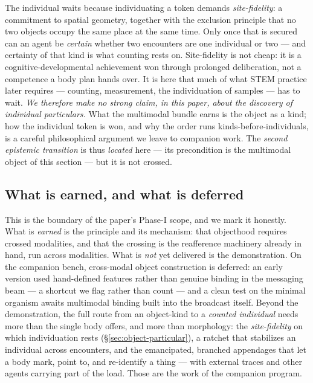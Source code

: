 \documentclass{article}
\begin{document}
The individual waits because individuating a token demands
\emph{site-fidelity}: a commitment to spatial geometry, together with the
exclusion principle that no two objects occupy the same place at the same
time.  Only once that is secured can an agent be \emph{certain} whether
two encounters are one individual or two --- and certainty of that kind is
what counting rests on.  Site-fidelity is not cheap: it is a
cognitive-developmental achievement won through prolonged deliberation,
not a competence a body plan hands over.  It is here that much of what
STEM practice later requires --- counting, measurement, the individuation
of samples --- has to wait.  \emph{We therefore make no strong claim, in
this paper, about the discovery of individual particulars.}  What the
multimodal bundle earns is the object as a kind; how the individual token
is won, and why the order runs kinds-before-individuals, is a careful
philosophical argument we leave to companion work.  The \emph{second
epistemic transition} is thus \emph{located} here --- its precondition is
the multimodal object of this section --- but it is not crossed.

\subsection{What is earned, and what is deferred}\label{sec:object-seam}

This is the boundary of the paper's Phase-I scope, and we mark it
honestly.  What is \emph{earned} is the principle and its mechanism: that
objecthood requires crossed modalities, and that the crossing is the
reafference machinery already in hand, run across modalities.  What is
\emph{not} yet delivered is the demonstration.  On the companion bench,
cross-modal object construction is deferred: an early version used
hand-defined features rather than genuine binding in the messaging beam
--- a shortcut we flag rather than count --- and a clean test on the
minimal organism awaits multimodal binding built into the broadcast
itself.  Beyond the demonstration, the full route from an object-kind to
a \emph{counted individual} needs more than the single body offers, and
more than morphology: the \emph{site-fidelity} on which individuation
rests (\S\ref{sec:object-particular}), a ratchet that stabilizes an
individual across encounters, and the emancipated, branched appendages
that let a body mark, point to, and re-identify a thing --- with external
traces and other agents carrying part of the load.  Those are the work of
the companion program.
\end{document}
